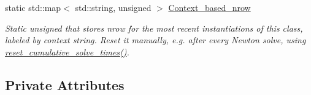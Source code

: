 \begin{DoxyCompactItemize}
static std\+::map$<$ std\+::string, unsigned $>$ \hyperlink{classoomph_1_1HyprePreconditioner_a7d378145491234f85def4915c2e98249}{Context\+\_\+based\+\_\+nrow}
\begin{DoxyCompactList}\small\item\em Static unsigned that stores nrow for the most recent instantiations of this class, labeled by context string. Reset it manually, e.\+g. after every Newton solve, using \hyperlink{classoomph_1_1HyprePreconditioner_a126763a53b2c687bc1b150d0fc64fbb6}{reset\+\_\+cumulative\+\_\+solve\+\_\+times()}. \end{DoxyCompactList}\end{DoxyCompactItemize}
\subsection*{Private Attributes}
